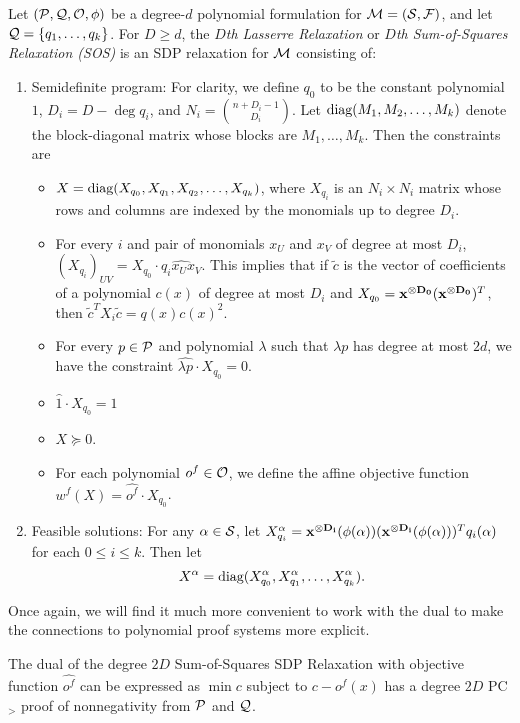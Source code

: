 \begin{definition}
Let $(\mathcal P, \mathcal Q, \mathcal O, \phi)$ be a degree-$d$ polynomial formulation for $\mathcal M = (\mathcal S, \mathcal F)$, and let $\mathcal Q = \{q_1, \dots, q_k\}$. For $D \geq d$, the \emph{$D$th Lasserre Relaxation} or \emph{$D$th Sum-of-Squares Relaxation (SOS)} is an SDP relaxation for $\mathcal M$ consisting of:
\begin{enumerate}
    \item Semidefinite program: For clarity, we define $q_0$ to be the constant polynomial $1$, $D_i = D - \deg q_i$, and $N_i = \binom{n+D_i-1}{D_i}$. Let $\text{diag}(M_1, M_2, \dots, M_k)$ denote the block-diagonal matrix whose blocks are $M_1,\dots,M_k$. Then the constraints are 
		\begin{itemize}
		\item $X = \text{diag}(X_{q_0}, X_{q_1}, X_{q_2}, \dots, X_{q_k})$, where $X_{q_i}$ is an $N_i \times N_i$ matrix whose rows and columns are indexed by the monomials up to degree $D_i$. 
		\item For every $i$ and pair of monomials $x_U$ and $x_V$ of degree at most $D_i$, $(X_{q_i})_{UV} = X_{q_0} \cdot \widehat{q_ix_Ux_V}$. This implies that if $\tilde{c}$ is the vector of coefficients of a polynomial $c(x)$ of degree at most $D_i$ and $X_{q_0} = \mathbf{x^{\otimes D_0}}(\mathbf{x^{\otimes D_0}})^T$, then $\tilde{c}^TX_i\tilde{c} = q(x)c(x)^2$. 
		\item For every $p \in \mathcal P$ and polynomial $\lambda$ such that $\lambda p$ has degree at most $2d$, we have the constraint $\widehat{\lambda p} \cdot X_{q_0} = 0$. 
		\item $\widehat{1} \cdot X_{q_0} = 1$ 
		\item $X \succeq 0$. 
		\item For each polynomial $o^f \in \mathcal O$, we define the affine objective function $w^f(X) = \widehat{o^f} \cdot X_{q_0}$.
		\end{itemize}
    \item Feasible solutions: For any $\alpha \in \mathcal S$, let $X_{q_i}^\alpha = \mathbf{x^{\otimes D_i}}(\phi(\alpha))(\mathbf{x^{\otimes D_i}}(\phi(\alpha)))^Tq_i(\alpha)$ for each $0 \leq i \leq k$. Then let
\[X^\alpha = \text{diag}(X_{q_0}^\alpha, X_{q_1}^\alpha,\dots,X_{q_k}^\alpha).\]
\end{enumerate}
\end{definition}
Once again, we will find it much more convenient to work with the dual to make the connections to polynomial proof systems more explicit.
\begin{lemma}
The dual of the degree $2D$ Sum-of-Squares SDP Relaxation with objective function $\widehat{o^f}$ can be expressed as  $\min c$ subject to $c - o^f(x)$ has a degree $2D$ PC$_>$ proof of nonnegativity from $\mathcal P$ and $\mathcal Q$.
\end{lemma}
